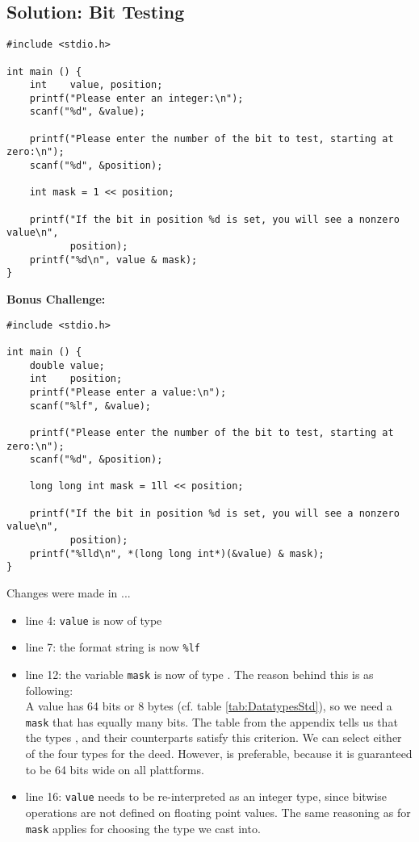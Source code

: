 {\subsection*{Solution: Bit Testing}
\begin{codebox}[exo4-3.c]
\begin{verbatim}
#include <stdio.h>

int main () {
    int    value, position;
    printf("Please enter an integer:\n");
    scanf("%d", &value);
    
    printf("Please enter the number of the bit to test, starting at zero:\n");
    scanf("%d", &position);
    
    int mask = 1 << position;
    
    printf("If the bit in position %d is set, you will see a nonzero value\n",
           position);
    printf("%d\n", value & mask);
}
\end{verbatim}
\end{codebox}

\textbf{Bonus Challenge:}
\begin{codebox}
\begin{verbatim}
#include <stdio.h>

int main () {
    double value;
    int    position;
    printf("Please enter a value:\n");
    scanf("%lf", &value);

    printf("Please enter the number of the bit to test, starting at zero:\n");
    scanf("%d", &position);

    long long int mask = 1ll << position;

    printf("If the bit in position %d is set, you will see a nonzero value\n",
           position);
    printf("%lld\n", *(long long int*)(&value) & mask);
}
\end{verbatim}
\end{codebox}

Changes were made in ...
\begin{itemize}
\item line 4: \texttt{value} is now of type 
\item line 7: the format string is now \texttt{\%lf}
\item line 12: the variable \texttt{mask} is now of type . The reason behind this is as following:\\
	A  value has 64 bits or 8 bytes (cf. table \ref{tab:DatatypesStd}), so we need a \texttt{mask} that has equally many bits.
	The table from the appendix tells us that the types ,  and their  counterparts satisfy this criterion.
	We can select either of the four types for the deed. However,  is preferable, because it is guaranteed to be 64 bits wide on all plattforms.
\item line 16: \texttt{value} needs to be re-interpreted as an integer type, since bitwise operations are not defined on floating point values.
	The same reasoning as for \texttt{mask} applies for choosing the type we cast into.\\
\end{itemize}

}
